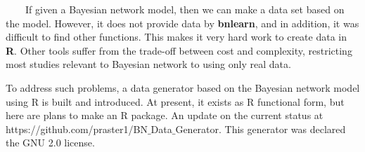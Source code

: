 ~~~~If given a Bayesian network model, then we can make a data set based on the model. However, it does not provide data by \textbf{bnlearn}, and in addition, it was difficult to find other functions. This makes it very hard work to create data in \textbf{R}. Other tools suffer from the trade-off between cost and complexity, restricting most studies relevant to Bayesian network to using only real data.

To address such problems, a data generator based on the Bayesian network model using R is built and introduced. At present, it exists as R functional form, but here are plans to make an R package. An update on the current status at https://github.com/praster1/BN$\_$Data$\_$Generator. This generator was declared the GNU 2.0 license.